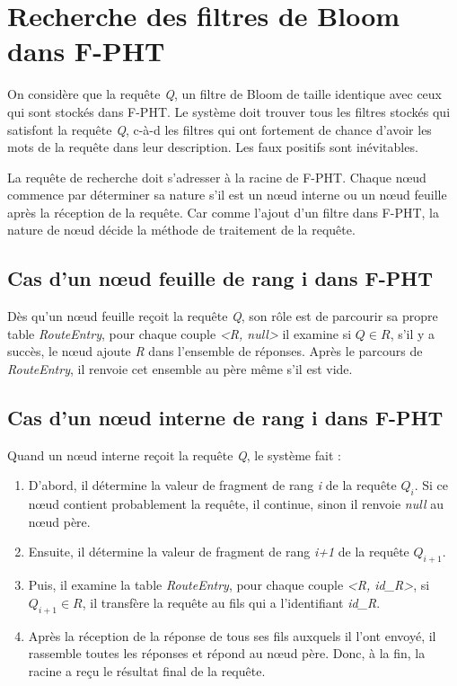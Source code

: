 \documentclass[a4paper,11pt]{report}
\begin{document}
\section{Recherche des filtres de Bloom dans F-PHT}
	On considère que la requête \textit{Q}, un filtre de Bloom de taille identique avec ceux qui sont stockés dans F-PHT. Le système doit trouver tous les filtres stockés qui satisfont la requête \textit{Q}, c-à-d les filtres qui ont fortement de chance d'avoir les mots de la requête dans leur description. Les faux positifs sont inévitables.
	
	La requête de recherche doit s'adresser à la racine de F-PHT. Chaque nœud commence par déterminer sa nature s'il est un nœud interne ou un nœud  feuille  après la réception de la requête. Car comme l'ajout d'un filtre dans F-PHT, la nature de nœud décide la méthode de traitement de la requête.
	
\subsection{Cas d'un nœud feuille de rang i dans F-PHT}
	Dès qu'un nœud feuille reçoit la requête \textit{Q}, son rôle est de parcourir sa propre table \textit{RouteEntry}, pour chaque couple \textit{<R, null>} il examine si $Q \in R$, s'il y a succès, le nœud ajoute \textit{R} dans l'ensemble de réponses. Après le parcours de \textit{RouteEntry}, il renvoie cet ensemble au père même s'il est vide.
	
\subsection{Cas d'un nœud interne de rang i dans F-PHT}
	Quand un nœud interne reçoit la requête \textit{Q}, le système fait :
	\begin{enumerate}
		\item D'abord, il détermine la valeur de fragment de rang \textit{i} de la requête \textit{$Q_i$}. Si ce nœud contient probablement la requête, il continue, sinon il renvoie \textit{null} au nœud père.
		\item Ensuite, il détermine la valeur de fragment de rang \textit{i+1} de la requête \textit{$Q_{i+1}$}.
		\item Puis, il examine la table \textit{RouteEntry}, pour chaque couple \textit{<R, id\_R>}, si $Q_{i+1} \in R$, il transfère la requête au fils qui a l'identifiant \textit{id\_R}.
		\item Après la réception de la réponse de tous ses fils auxquels il l'ont envoyé, il rassemble toutes les réponses et répond au nœud père. Donc, à la fin, la racine a reçu le résultat final de la requête.
	\end{enumerate}
	
\end{document}
